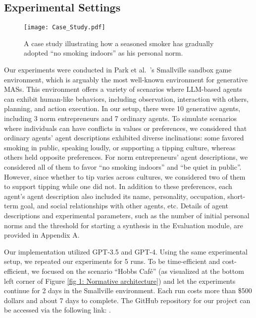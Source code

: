 \documentclass{article}
\begin{document}
\subsection{Experimental Settings}
\label{subsec: experimenal settings}

\begin{figure*}[htbp]
    \centering
    \texttt{[image: Case\_Study.pdf]}
    \vspace{-1cm}
    \caption{A case study illustrating how a seasoned smoker has gradually adopted ``no smoking indoors'' as his personal norm. 
    }
    \vspace{-0.3cm}
    \label{fig 2: case study}
\end{figure*}
Our experiments were conducted in  Park et al.~'s Smallville sandbox game environment, which is arguably the most well-known environment for generative MASs. This environment offers a variety of scenarios where LLM-based agents can exhibit human-like behaviors, including observation, interaction with others, planning, and action execution.
In our setup, there were 10 generative agents, including 3 norm entrepreneurs and 7 ordinary agents.
To simulate scenarios where individuals can have conflicts in values or preferences, we considered that ordinary agents' agent descriptions exhibited diverse inclinations: some favored smoking in public, speaking loudly, or supporting a tipping culture, whereas others held opposite preferences. 
For norm entrepreneurs' agent descriptions, we considered all of them to favor ``no smoking indoors'' and ``be quiet in public''. However, since whether to tip varies across cultures, we considered two of them to support tipping while one did not. In addition to these preferences, each agent's agent description also included its name, personality, occupation, short-term goal, and social relationships with other agents, etc.
Details of agent descriptions and experimental parameters, such as the number of initial personal norms  and the threshold for starting a synthesis in the Evaluation module, are provided in Appendix A. 

Our implementation utilized GPT-3.5 and GPT-4. Using the same experimental setup, we repeated our experiments for 5 runs. To be time-efficient and cost-efficient, we focused on the scenario ``Hobbs Café'' (as visualized at the bottom left corner of Figure \ref{fig 1: Normative architecture}) and let the experiments continue for 2 days in the Smallville environment.
Each run costs more than \$500 dollars and about 7 days to complete.  
The GitHub repository for our project can be accessed via the following link: \href{https://github.com/sxswz213/CRSEC}{\color{blue}{https://github.com/sxswz213/CRSEC}}.
\end{document}
